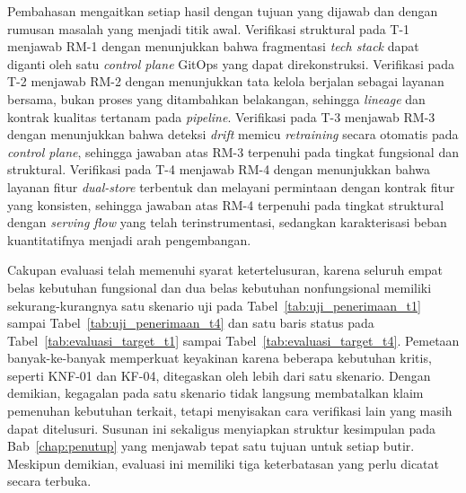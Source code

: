 Pembahasan mengaitkan setiap hasil dengan tujuan yang dijawab dan dengan rumusan masalah yang menjadi titik awal. Verifikasi struktural pada T-1 menjawab RM-1 dengan menunjukkan bahwa fragmentasi \textit{tech stack} dapat diganti oleh satu \textit{control plane} GitOps yang dapat direkonstruksi. Verifikasi pada T-2 menjawab RM-2 dengan menunjukkan tata kelola berjalan sebagai layanan bersama, bukan proses yang ditambahkan belakangan, sehingga \textit{lineage} dan kontrak kualitas tertanam pada \textit{pipeline}. Verifikasi pada T-3 menjawab RM-3 dengan menunjukkan bahwa deteksi \textit{drift} memicu \textit{retraining} secara otomatis pada \textit{control plane}, sehingga jawaban atas RM-3 terpenuhi pada tingkat fungsional dan struktural. Verifikasi pada T-4 menjawab RM-4 dengan menunjukkan bahwa layanan fitur \textit{dual-store} terbentuk dan melayani permintaan dengan kontrak fitur yang konsisten, sehingga jawaban atas RM-4 terpenuhi pada tingkat struktural dengan \textit{serving flow} yang telah terinstrumentasi, sedangkan karakterisasi beban kuantitatifnya menjadi arah pengembangan.

Cakupan evaluasi telah memenuhi syarat ketertelusuran, karena seluruh empat belas kebutuhan fungsional dan dua belas kebutuhan nonfungsional memiliki sekurang-kurangnya satu skenario uji pada Tabel~\ref{tab:uji_penerimaan_t1} sampai Tabel~\ref{tab:uji_penerimaan_t4} dan satu baris status pada Tabel~\ref{tab:evaluasi_target_t1} sampai Tabel~\ref{tab:evaluasi_target_t4}. Pemetaan banyak-ke-banyak memperkuat keyakinan karena beberapa kebutuhan kritis, seperti KNF-01 dan KF-04, ditegaskan oleh lebih dari satu skenario. Dengan demikian, kegagalan pada satu skenario tidak langsung membatalkan klaim pemenuhan kebutuhan terkait, tetapi menyisakan cara verifikasi lain yang masih dapat ditelusuri. Susunan ini sekaligus menyiapkan struktur kesimpulan pada Bab~\ref{chap:penutup} yang menjawab tepat satu tujuan untuk setiap butir. Meskipun demikian, evaluasi ini memiliki tiga keterbatasan yang perlu dicatat secara terbuka.

